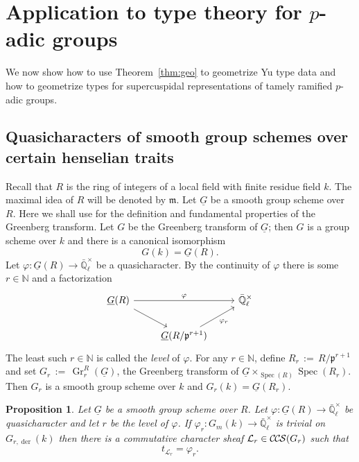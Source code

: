 \documentclass[10pt]{amsart}
\theoremstyle{plain}
\newtheorem{proposition}[theorem]{Proposition}
\theoremstyle{definition}
\newcommand{\NN}{{\mathbb{N}}}
\newcommand{\EE}{\mathbb{\bar Q}_\ell}
\newcommand{\Fq}{k}
\newcommand{\EEx}{\EE^\times}
\DeclareMathOperator{\Gr}{Gr}
\newcommand{\Spec}[1]{{\operatorname{Spec}(#1)}}
\newcommand{\ceq}{{\, :=\, }}
\newcommand{\trFrob}[1]{t_{#1}}
\newcommand{\cs}[1]{{\mathcal{#1}}}
\newcommand{\CCS}{{\mathcal{C\hskip-.8pt C\hskip-0.8pt S}}}
\begin{document}
\section{Application to type theory for \texorpdfstring{$p$}{p}-adic groups}\label{sec:types}

We now show how to use Theorem~\ref{thm:geo} to geometrize Yu type data and how to geometrize types for supercuspidal representations of tamely ramified $p$-adic groups.

\subsection{Quasicharacters of smooth group schemes over certain henselian traits}\label{ssec:quasicharacters}

Recall that $R$ is the ring of integers of a local field with finite residue field $k$.
The maximal idea of $R$ will be denoted by $\mathfrak{m}$. 
Let $\underline{G}$ be a smooth group scheme over $R$.
Here we shall use  \cite{bertapelle-gonzales:Greenberg} for the definition and fundamental properties of the Greenberg transform.
Let $G$ be the Greenberg transform of $\underline{G}$; then $G$ is a group scheme over $\Fq$ and there is a canonical isomorphism
\[
G(\Fq) = \underline{G}(R).
\]
Let $\varphi : \underline{G}(R) \to \EEx$ be a quasicharacter. 
By the continuity of $\varphi$ there is some $r \in \NN$ and a factorization
\[
\begin{tikzcd}
\underline{G}(R) \arrow{rr}{\varphi} \arrow{rd} && \EEx\\
& \underline{G}(R/\mathfrak{p}^{r+1}) \arrow{ru}[swap]{\varphi_r} 
\end{tikzcd}
\] 
The least such $r\in \NN$ is called the {\it level} of $\varphi$.
For any $r\in \NN$, define $R_r \ceq R/\mathfrak{p}^{r+1}$ and
set $G_r \ceq \Gr_r^{R}(\underline{G})$, the Greenberg transform of $\underline{G}\times_{\Spec{R}}\Spec{R_r}$.
Then $G_r$ is a smooth group scheme over $\Fq$ and $G_r(\Fq) = \underline{G}(R_r)$.

\begin{proposition}\label{prop:quasicharacters}
Let $\underline{G}$ be a smooth group scheme over $R$.
Let $\varphi : \underline{G}(R) \to \EEx$ be quasicharacter and let $r$ be the level of $\varphi$.
If $\varphi_r : G_m(k)\to \EEx$ is trivial on $G_{r,\operatorname{der}}(k)$ then 
there is a commutative character sheaf $\cs{L}_r\in \CCS(G_r)$ such that 
\[
\trFrob{\cs{L}_r} =  \varphi_r.
\] 
\end{proposition}
\end{document}
